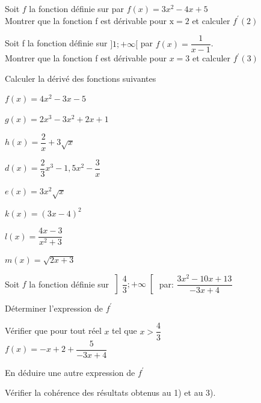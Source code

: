 \documentclass[12pt,a4paper]{article}  %
\begin{document}

Soit $f$ la fonction définie sur \R par $f(x)=3 x^{2}-4 x+5$\\
 Montrer que la fonction f est dérivable pour $\mathrm{x}=2$ et calculer $f^{\prime}(2)$

Soit f la fonction définie sur $] 1 ;+\infty[$ par $f(x)=\dfrac{1}{x-1}$.\\
Montrer que la fonction f est dérivable pour $x=3$ et calculer $f^{\prime}(3)$


Calculer la dérivé des fonctions suivantes
\begin{enumMet}
    \item $f(x)=4 x^{2}-3 x-5$
    \item {} $g(x)=2 x^{3}-3 x^{2}+2 x+1$
    \item $h(x)=\dfrac{2}{x}+3 \sqrt{x}$
    \item $d(x)=\dfrac{2}{3} x^{3}-1,5 x^{2}-\dfrac{3}{x}$
    \item $e(x)=3 x^{2} \sqrt{x}$
    \item {} $k(x)=(3x-4)^{2}$
    \item $l(x)=\dfrac{4x-3}{x^{2}+3}$
    \item $m(x)=\sqrt{2x+3}$
\end{enumMet}

Soit $f$ la fonction définie sur $\left] \dfrac{4}{3} ;+\infty\right[$ par: $\dfrac{3 x^{2}-10x+13}{-3 x+4}$
\begin{enumMet}
    \item Déterminer l'expression de $f^{\prime}$
    \item Vérifier que pour tout réel $x$ tel que $x>\dfrac{4}{3}$\\ $f(x)=-x+2+\dfrac{5}{-3 x+4}$
    \item En déduire une autre expression de $f^{\prime}$
    \item Vérifier la cohérence des résultats obtenus au 1) et au 3).
\end{enumMet}


\end{document}
